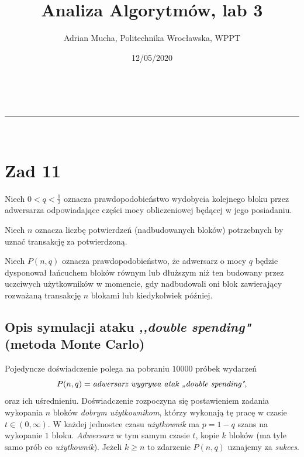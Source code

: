 \documentclass[a4paper,11pt]{article}
\makeatletter
\newcommand{\linia}{\rule{\linewidth}{0.5pt}}
\theoremstyle{mytheor}
\renewcommand{\maketitle}{
\begin{center}
\vspace{2ex}
{\huge \textsc{\@title}}
\vspace{1ex}
\\
\linia\\
\@author \hfill \@date
\vspace{4ex}
\end{center}
}
\makeatother
\begin{document}
\title{Analiza Algorytmów, lab 3}

\author{Adrian Mucha, Politechnika Wrocławska, WPPT}

\date{12/05/2020}

\maketitle

\section*{Zad 11}
Niech $0 < q < \frac{1}{2}$ oznacza prawdopodobieństwo wydobycia kolejnego bloku przez adwersarza odpowiadające części mocy obliczeniowej będącej w jego posiadaniu.

Niech $n$ oznacza liczbę potwierdzeń (nadbudowanych bloków) potrzebnych by uznać transakcję za potwierdzoną.

Niech $P(n, q)$ oznacza prawdopodobieństwo, że adwersarz o mocy $q$ będzie dysponował łańcuchem bloków równym lub
dłuższym niż ten budowany przez uczciwych użytkowników w momencie, gdy nadbudowali oni blok zawierający rozważaną transakcję $n$ blokami lub kiedykolwiek później.

\subsection*{Opis symulacji ataku \emph{,,double spending"} (metoda Monte Carlo)}
Pojedyncze doświadczenie polega na pobraniu $10000$ próbek wydarzeń
$$P(n, q) = \emph{adwersarz wygrywa atak ,,double spending"},$$
oraz ich uśrednieniu. Doświadczenie rozpoczyna się postawieniem zadania wykopania $n$ bloków \emph{dobrym użytkownikom}, którzy wykonają tę pracę w czasie $t\in(0, \infty)$. W każdej jednostce czasu \emph{użytkownik} ma $p = 1 - q$ szans na wykopanie $1$ bloku. \emph{Adwersarz} w tym samym czasie $t$, kopie $k$ bloków (ma tyle samo prób co \emph{użytkownik}). Jeżeli $k \geq n$ to zdarzenie $P(n, q)$ uznajemy za \emph{sukces}.
\end{document}
